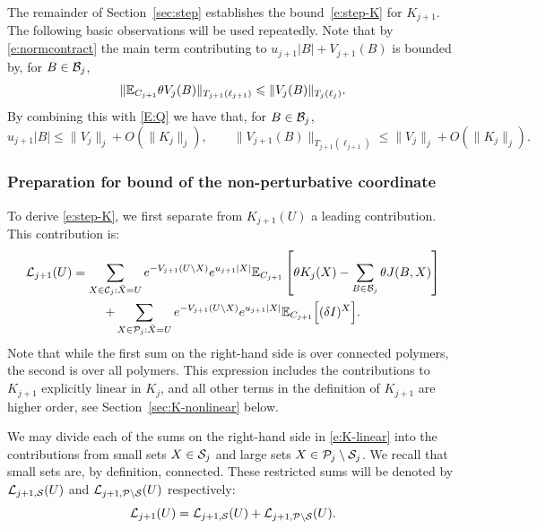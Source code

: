 \documentclass[11pt]{amsart}
\numberwithin{equation}{section}
\numberwithin{theorem}{section}
\newcommand{\1}{{\bf 1}}
\begin{document}
\smallskip The remainder of Section~\ref{sec:step}
  establishes the bound~\eqref{e:step-K} for $K_{j+1}$.  The following
  basic observations will be used repeatedly. Note that by
\eqref{e:normcontract} the main term contributing to
$u_{j+1}|B|+V_{j+1}(B)$ is bounded by, for $B\in \mathcal B_j$,
\begin{equation}
  \|\mathbb{E}_{C_{j+1}}\theta V_j(B)\|_{T_{j+1}(\ell_{j+1})} \leqslant \|V_j(B)\|_{T_j(\ell_j)}.
\end{equation}
By combining this with \eqref{E:Q} we have that, for $B\in\mathcal B_{j}$,
\begin{equation}
\label{E:vj}
u_{j+1}|B| \leq \|V_j\|_j + O( \|K_j\|_j),
\qquad
\|V_{j+1}(B)\|_{T_{j+1}(\ell_{j+1})} \leq \|V_j\|_j + O( \|K_j\|_j).
\end{equation}


\subsubsection{Preparation for bound of the non-perturbative coordinate}

To derive \eqref{e:step-K},
we first separate from $K_{j+1}(U)$ a leading contribution.
This contribution is: 
\begin{multline} \label{e:K-linear}
  \mathcal L_{j+1}(U)
  = \sum_{X\in \mathcal C_j: \bar X=U} e^{-V_{j+1}(U\setminus X)} e^{u_{j+1}|X|} \mathbb{E}_{C_{j+1}}\left[{\theta K_j(X) 
    - \sum_{B\in \mathcal B_j} \theta J(B,X)}\right]\\
     +\sum_{X\in \mathcal P_j: \bar X=U} e^{-V_{j+1}(U\setminus X)} e^{u_{j+1}|X|} \mathbb{E}_{C_{j+1}} \Bigl[{ (\delta I)^X }\Bigr].
\end{multline}
Note that while the first sum on the right-hand side is over connected
polymers, the second is over all polymers.  This expression includes
the contributions to $K_{j+1}$ explicitly linear in $K_{j}$,
and 
all other terms in the definition of $K_{j+1}$ are higher order, see
Section~\ref{sec:K-nonlinear} below.

We may divide each of the sums on the right-hand side in \eqref{e:K-linear} into the contributions
from small sets $X \in \mathcal S_j$ and large sets
$X \in \mathcal P_j\setminus \mathcal S_j$. We recall that small sets are, by definition, connected. 
These restricted sums will be denoted by $\mathcal L_{j+1, \mathcal S}(U)$
and $\mathcal L_{j+1, \mathcal P\setminus \mathcal S }(U)$ respectively:
\begin{equation}\label{e:K-linear-split}
  \mathcal L_{j+1}(U) = \mathcal L_{j+1,\mathcal S}(U) +   \mathcal L_{j+1,\mathcal P\setminus \mathcal S}(U).
\end{equation}
\end{document}
